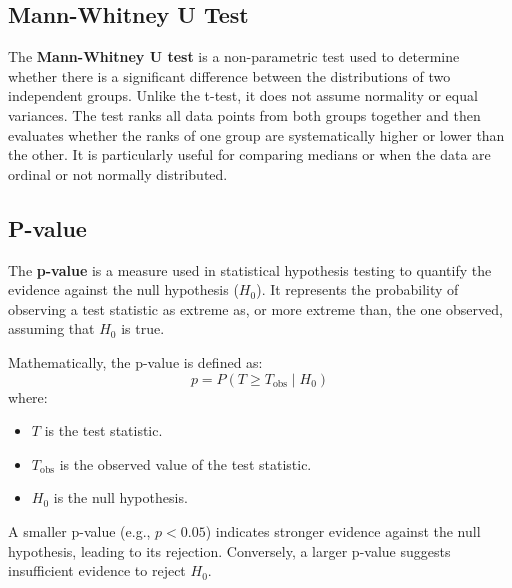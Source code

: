 \subsection{Mann-Whitney U Test} \label{appendix:mann}
The \textbf{Mann-Whitney U test} is a non-parametric test used to determine whether there is a significant difference between the distributions of two independent groups. Unlike the t-test, it does not assume normality or equal variances. The test ranks all data points from both groups together and then evaluates whether the ranks of one group are systematically higher or lower than the other. It is particularly useful for comparing medians or when the data are ordinal or not normally distributed. \cite{mann1947}

\subsection{P-value} \label{appendix:pvalue}
The \textbf{p-value} is a measure used in statistical hypothesis testing to quantify the evidence against the null hypothesis (\(H_0\)). It represents the probability of observing a test statistic as extreme as, or more extreme than, the one observed, assuming that \(H_0\) is true.

Mathematically, the p-value is defined as:
\[
p = P(T \geq T_{\text{obs}} \mid H_0)
\]
where:
\begin{itemize}
    \item \(T\) is the test statistic.
    \item \(T_{\text{obs}}\) is the observed value of the test statistic.
    \item \(H_0\) is the null hypothesis.
\end{itemize}

A smaller p-value (e.g., \(p < 0.05\)) indicates stronger evidence against the null hypothesis, leading to its rejection. Conversely, a larger p-value suggests insufficient evidence to reject \(H_0\). \cite{pearson1900}
